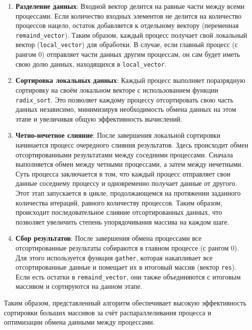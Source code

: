 \documentclass[12pt]{article}
\begin{document}
\begin{enumerate}
    \item \textbf{Разделение данных}: Входной вектор делится на равные части между всеми процессами. Если количество входных элементов не делится на количество процессов нацело, остаток добавляется к отдельному вектору (переменная \texttt{remaind\_vector}). Таким образом, каждый процесс получает свой локальный вектор (\texttt{local\_vector}) для обработки. В случае, если главный процесс (с рангом 0) отправляет части данных другим процессам, он сам будет иметь свою долю данных, находящихся в \texttt{local\_vector}.

    \item \textbf{Сортировка локальных данных}: Каждый процесс выполняет поразрядную сортировку на своём локальном векторе с использованием функции \texttt{radix\_sort}. Это позволяет каждому процессу отсортировать свою часть данных независимо, минимизируя необходимость обмена данных на этом этапе и увеличивая общую эффективность вычислений.

    \item \textbf{Четно-нечетное слияние}: После завершения локальной сортировки начинается процесс очередного слияния результатов. Здесь происходит обмен отсортированными результатами между соседними процессами. Сначала выполняется обмен между четными процессами, а затем между нечетными. Суть процесса заключается в том, что каждый процесс отправляет свои данные соседнему процессу и одновременно получает данные от другого. Этот этап запускается в цикле, продолжающемся на протяжении заданного количества итераций, равного количеству процессов. Таким образом, происходит последовательное слияние отсортированных данных, что позволяет увеличить степень упорядочивания массива на каждом шаге.

    \item \textbf{Сбор результатов}: После завершения обмена процессами все отсортированные результаты собираются в главном процессе (с рангом 0). Для этого используется функция \texttt{gather}, которая накапливает все отсортированные данные и помещает их в итоговый массив (вектор \texttt{res}). Если есть остатки в \texttt{remaind\_vector}, они также объединяются с итоговым массивом и сортируются на данном этапе.
\end{enumerate}

Таким образом, представленный алгоритм обеспечивает высокую эффективность сортировки больших массивов за счёт распараллеливания процесса и оптимизации обмена данными между процессами.
\end{document}
